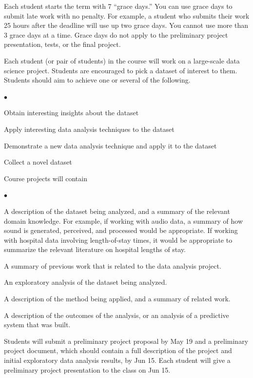 \documentclass[11pt]{article}
\newenvironment{category}[1]%
   {\ifvmode\else\unskip\par\fi\vfill\noindent
    \smash{{\parbox[t]{.75in}{\raisebox{-10ex}{\begin{turn}{60}
        {\parbox[t]{1in}{\centering\bfseries#1}}\end{turn}}}}}
    \hfill\begin{minipage}[t]{6.625in}\par\ignorespaces}%
   {\ifvmode\else\unskip\par\fi\end{minipage}\par\vfill\ignorespaces}
\renewenvironment{itemize}%
   {\ifvmode\else\unskip\par\fi\begin{list}{$\bullet$}%
       {\setlength{\topsep}{.25ex plus .125ex minus .1825ex}
        \setlength{\itemsep}{\topsep}\setlength{\parsep}{0ex}
        \setlength{\leftmargin}{1.75em}\setlength{\labelsep}{.5em}
        \setlength{\labelwidth}{1.75em}}\ignorespaces}%
   {\ifvmode\else\unskip\fi\end{list}\par\ignorespaces}
\begin{document}
\begin{category}{Late work}
    Each student starts the term with 7 ``grace days.'' You can use grace days to submit
    late work with no penalty. For example, a student who submits their work 25 hours after
    the deadline will use up two grace days. You cannot use more than 3 grace days at a
    time. Grace days do not apply to the preliminary project presentation, tests, or the
    final project.
\end{category}


\begin{category}{Course project}
    Each student (or pair of students) in the course will work on a large-scale data
    science project. Students are encouraged to pick a dataset of interest to them.
    Students should aim to achieve one or several of the following.
    \begin{itemize}
        \item Obtain interesting insights about the dataset
        \item Apply interesting data analysis techniques to the dataset
        \item Demonstrate a new data analysis technique and apply it to the dataset
        \item Collect a novel dataset
    \end{itemize}

    Course projects will contain
    \begin{itemize}
        \item A description of the dataset being analyzed, and a summary of the relevant
              domain knowledge. For example, if working with audio data, a summary of how
              sound is generated, perceived, and processed would be appropriate. If working
              with hospital data involving length-of-stay times, it would be appropriate
              to summarize the relevant literature on hospital lengths of stay.
        \item A summary of previous work that is related to the data analysis project.
        \item An exploratory analysis of the dataset being analyzed.
        \item A description of the method being applied, and a summary of related work.
        \item A description of the outcomes of the analysis, or an analysis of a predictive
              system that was built.
    \end{itemize}

    Students will submit a preliminary project proposal by May 19 and a preliminary project
    document, which should contain a full description of the project and initial
    exploratory data analysis results, by Jun 15. Each student will give a preliminary
    project presentation to the class on Jun 15.
\end{category}
\end{document}
